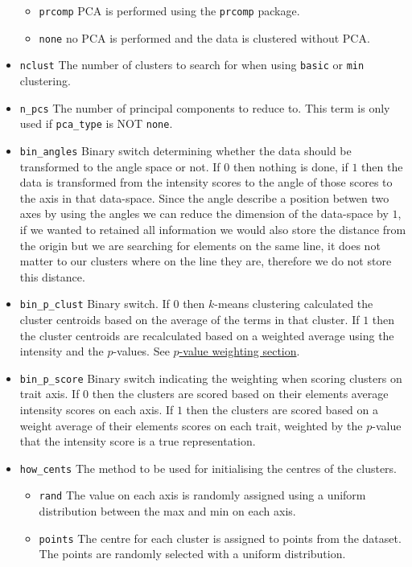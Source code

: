 \documentclass[
]{article}
\providecommand{\tightlist}{%
  \setlength{\itemsep}{0pt}\setlength{\parskip}{0pt}}
\begin{document}
\begin{itemize}
  \begin{itemize}
  \tightlist
  \item
    \texttt{prcomp} PCA is performed using the \texttt{prcomp} package.
  \item
    \texttt{none} no PCA is performed and the data is clustered without
    PCA.
  \end{itemize}
\item
  \texttt{nclust} The number of clusters to search for when using
  \texttt{basic} or \texttt{min} clustering.
\item
  \texttt{n\_pcs} The number of principal components to reduce to. This
  term is only used if \texttt{pca\_type} is NOT \texttt{none}.
\item
  \texttt{bin\_angles} Binary switch determining whether the data should
  be transformed to the angle space or not. If \(0\) then nothing is
  done, if \(1\) then the data is transformed from the intensity scores
  to the angle of those scores to the axis in that data-space. Since the
  angle describe a position betwen two axes by using the angles we can
  reduce the dimension of the data-space by \(1\), if we wanted to
  retained all information we would also store the distance from the
  origin but we are searching for elements on the same line, it does not
  matter to our clusters where on the line they are, therefore we do not
  store this distance.
\item
  \texttt{bin\_p\_clust} Binary switch. If \(0\) then \(k\)-means
  clustering calculated the cluster centroids based on the average of
  the terms in that cluster. If \(1\) then the cluster centroids are
  recalculated based on a weighted average using the intensity and the
  \(p\)-values. See \protect\hyperlink{cluster_p_weight}{\(p\)-value
  weighting section}.
\item
  \texttt{bin\_p\_score} Binary switch indicating the weighting when
  scoring clusters on trait axis. If \(0\) then the clusters are scored
  based on their elements average intensity scores on each axis. If
  \(1\) then the clusters are scored based on a weight average of their
  elements scores on each trait, weighted by the \(p\)-value that the
  intensity score is a true representation.
\item
  \texttt{how\_cents} The method to be used for initialising the centres
  of the clusters.

  \begin{itemize}
  \tightlist
  \item
    \texttt{rand} The value on each axis is randomly assigned using a
    uniform distribution between the max and min on each axis.
  \item
    \texttt{points} The centre for each cluster is assigned to points
    from the dataset. The points are randomly selected with a uniform
    distribution.
  \end{itemize}
\end{itemize}
\end{document}
